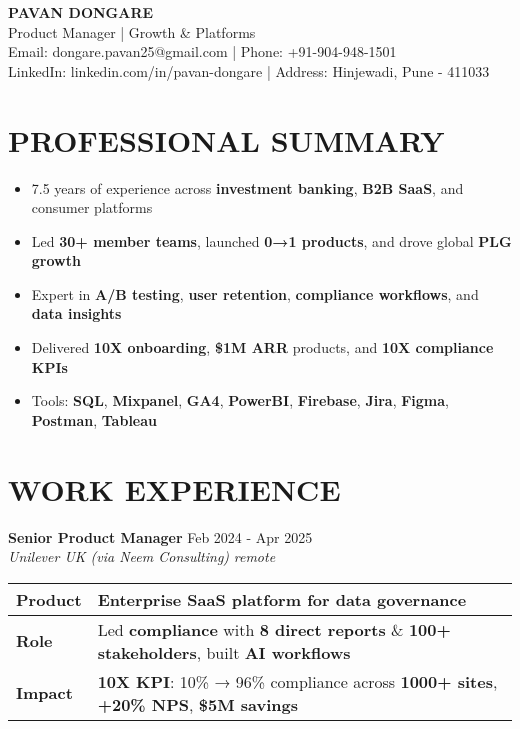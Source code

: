 \documentclass[10pt,a4paper]{article}
\newcommand{\experienceitem}[4]{
    \textbf{#1} \hfill #2 \\
    \textit{#3} \hfill \textit{#4}
}
\begin{document}
\begin{center}
    \textbf{\Large PAVAN DONGARE} \\
    \vspace{2pt}
    Product Manager | Growth \& Platforms \\
    \vspace{4pt}
    Email: dongare.pavan25@gmail.com | Phone: +91-904-948-1501 \\
    LinkedIn: linkedin.com/in/pavan-dongare | Address: Hinjewadi, Pune - 411033
\end{center}

\vspace{-8pt}

\vspace{12pt}
\section{PROFESSIONAL SUMMARY}
\begin{itemize}[leftmargin=*]
    \item 7.5 years of experience across \textbf{investment banking}, \textbf{B2B SaaS}, and consumer platforms
    \item Led \textbf{30+ member teams}, launched \textbf{0→1 products}, and drove global \textbf{PLG growth}
    \item Expert in \textbf{A/B testing}, \textbf{user retention}, \textbf{compliance workflows}, and \textbf{data insights}
    \item Delivered \textbf{10X onboarding}, \textbf{\$1M ARR} products, and \textbf{10X compliance KPIs}
    \item Tools: \textbf{SQL}, \textbf{Mixpanel}, \textbf{GA4}, \textbf{PowerBI}, \textbf{Firebase}, \textbf{Jira}, \textbf{Figma}, \textbf{Postman}, \textbf{Tableau}
\end{itemize}

\vspace{12pt}
\section{WORK EXPERIENCE}

\experienceitem{\textbf{Senior Product Manager}}{Feb 2024 - Apr 2025}{Unilever UK (via Neem Consulting)}{remote}

{\renewcommand{\arraystretch}{1.2}
\begin{tabularx}{\textwidth}{|>{\raggedright\arraybackslash}p{1.8cm}|X|}
\hline
\textbf{Product} & \textbf{Enterprise SaaS} platform for \textbf{data governance} \\
\hline
\textbf{Role} & Led \textbf{compliance} with \textbf{8 direct reports} \& \textbf{100+ stakeholders}, built \textbf{AI workflows} \\
\hline
\textbf{Impact} & \textbf{10X KPI}: 10\% → 96\% compliance across \textbf{1000+ sites}, \textbf{+20\% NPS}, \textbf{\$5M savings} \\
\hline
\end{tabularx}}
\end{document}

